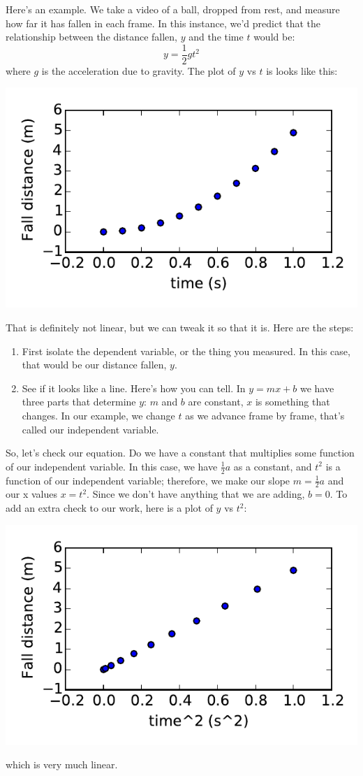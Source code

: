\documentclass[twoside,11pt,ShortChapTitles]{BYUTextbook}
\begin{document}
Here's an example.  We take a video of a ball, dropped from rest, and measure how far it has fallen in each frame.  In this instance, we'd predict that the relationship between the distance fallen, $y$ and the time $t$ would be:
\[y=\frac{1}{2}gt^2\]
where $g$ is the acceleration due to gravity.  The plot of $y$ vs $t$ is looks like this:
\begin{center}
\includegraphics{Lab4_figs/yvst.pdf}
\end{center}
That is definitely not linear, but we can tweak it so that it is.  Here are the steps:
\begin{enumerate}
\item First isolate the dependent variable, or the thing you measured.  In this case, that would be our distance fallen, $y$.
\item See if it looks like a line.  Here's how you can tell. In $y=mx+b$ we have three parts that determine $y$: $m$ and $b$ are constant, $x$ is something that changes.  In our example, we change $t$ as we advance frame by frame, that's called our independent variable.
\end{enumerate}
So, let's check our equation. Do we have a constant that multiplies some function of our independent variable.  In this case, we have $\frac{1}{2}a$ as a constant, and $t^2$ is a function of our independent variable; therefore, we make our slope $m=\frac{1}{2}a$ and our x values $x=t^2$. Since we don't have anything that we are adding, $b=0$.  To add an extra check to our work, here is a plot of $y$ vs $t^2$:
\begin{center}
\includegraphics{Lab4_figs/yvst2.pdf}
\end{center}
which is very much linear.
\end{document}
